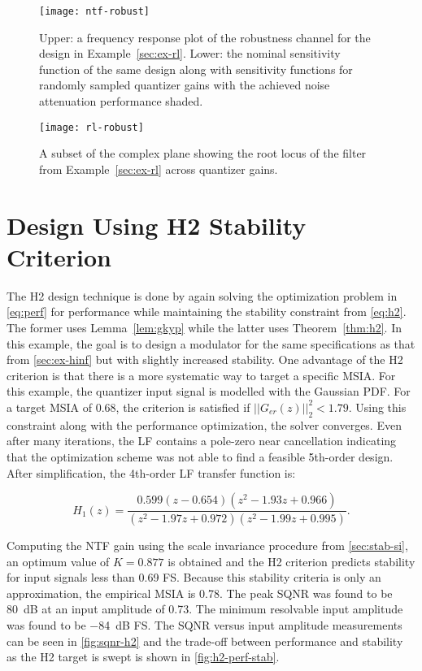 \begin{figure}
	\centering
	\texttt{[image: ntf-robust]}
	\caption{Upper: a frequency response plot of the robustness channel for the design in Example~\ref{sec:ex-rl}. Lower: the nominal sensitivity function of the same design along with sensitivity functions for randomly sampled quantizer gains with the achieved noise attenuation performance shaded.} \label{fig:ntf-rl}
\end{figure}

\begin{figure}
	\centering
	\texttt{[image: rl-robust]}
	\caption{A subset of the complex plane showing the root locus of the filter from Example~\ref{sec:ex-rl} across quantizer gains.} \label{fig:rl-rl}
\end{figure}

\section{Design Using \gls{H2} Stability Criterion}
\label{sec:ex-h2}

The \gls{H2} design technique is done by again solving the optimization problem in \autoref{eq:perf} for performance while maintaining the stability constraint from \autoref{eq:h2}. The former uses Lemma~\ref{lem:gkyp} while the latter uses Theorem~\ref{thm:h2}. In this example, the goal is to design a modulator for the same specifications as that from \autoref{sec:ex-hinf} but with slightly increased stability. One advantage of the \gls{H2} criterion is that there is a more systematic way to target a specific \gls{MSIA}. For this example, the quantizer input signal is modelled with the Gaussian \gls{PDF}. For a target \gls{MSIA} of 0.68, the criterion is satisfied if $||G_{er}(z)||^2_2<1.79$. Using this constraint along with the performance optimization, the solver converges. Even after many iterations, the \gls{LF} contains a pole-zero near cancellation indicating that the optimization scheme was not able to find a feasible 5th-order design. After simplification, the 4th-order \gls{LF} transfer function is:

\begin{equation*}
	H_1(z) = \frac{0.599\left(z - 0.654\right)\left(z^2 - 1.93z + 0.966\right)}{\left(z^2 - 1.97z + 0.972\right)\left(z^2 - 1.99z + 0.995\right)}.
\end{equation*}

Computing the NTF gain using the scale invariance procedure from \autoref{sec:stab-si}, an optimum value of $K = 0.877$ is obtained and the \gls{H2} criterion predicts stability for input signals less than 0.69 \gls{FS}. Because this stability criteria is only an approximation, the empirical \gls{MSIA} is 0.78. The peak SQNR was found to be \SI{80}{\deci\bel} at an input amplitude of 0.73. The minimum resolvable input amplitude was found to be \SI{-84}{\deci\bel} \gls{FS}. The \gls{SQNR} versus input amplitude measurements can be seen in \autoref{fig:sqnr-h2} and the trade-off between performance and stability as the \gls{H2} target is swept is shown in \autoref{fig:h2-perf-stab}.

